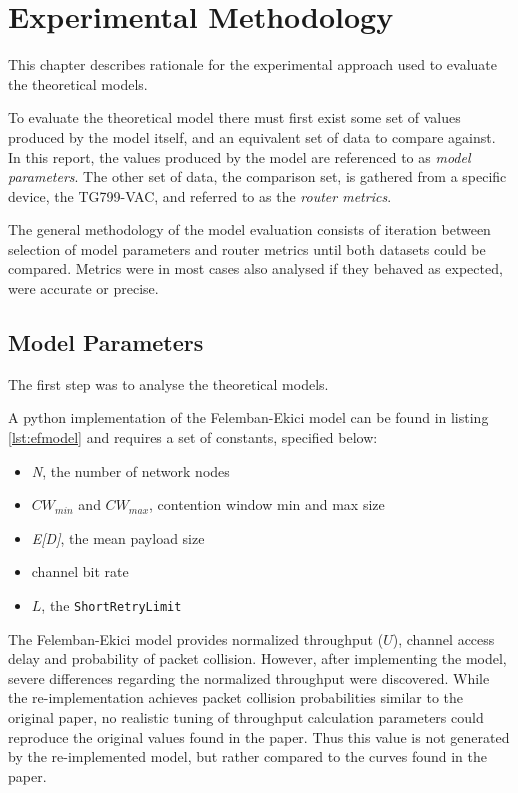
\chapter{Experimental Methodology}

This chapter describes rationale for the experimental approach used to evaluate
the theoretical models.

To evaluate the theoretical model there must first exist some set of values
produced by the model itself, and an equivalent set of data to compare against.
In this report, the values produced by the model are referenced to as
\emph{model parameters}. The other set of data, the comparison set, is gathered
from a specific device, the TG799-VAC, and referred to as the \emph{router
metrics}.

The general methodology of the model evaluation consists of iteration between
selection of model parameters and router metrics until both datasets could be
compared. Metrics were in most cases also analysed if they behaved as expected,
were accurate or precise.

\section{Model Parameters}
The first step was to analyse the theoretical models.

A python implementation of the Felemban-Ekici model can be found in listing
\ref{lst:efmodel} and requires a set of constants, specified below:

\begin{itemize}
	\item \emph{N}, the number of network nodes
	\item $CW_{min}$ and $CW_{max}$, contention window min and max size
	\item \emph{E[D]}, the mean payload size
	\item channel bit rate
	\item $L$, the \texttt{ShortRetryLimit}
\end{itemize}

The Felemban-Ekici model provides normalized throughput ($U$), channel access
delay and probability of packet collision. However, after implementing the
model, severe differences regarding the normalized throughput were discovered.
While the re-implementation achieves packet collision probabilities similar to
the original paper, no realistic tuning of throughput calculation parameters
could reproduce the original values found in the paper. Thus this value is not
generated by the re-implemented model, but rather compared to the curves found
in the paper.

